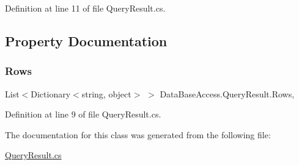 Definition at line 11 of file Query\+Result.\+cs.



\subsection{Property Documentation}
\mbox{\label{classDataBaseAccess_1_1QueryResult_ad6d699c5577f56da79740f1790433565}} 
\subsubsection{\texorpdfstring{Rows}{Rows}}
{\footnotesize\ttfamily List$<$Dictionary$<$string, object$>$ $>$ Data\+Base\+Access.\+Query\+Result.\+Rows\hspace{0.3cm}{\ttfamily [get]}, {}}



Definition at line 9 of file Query\+Result.\+cs.



The documentation for this class was generated from the following file\+:\begin{DoxyCompactItemize}
\item 
\mbox{\hyperlink{QueryResult_8cs}{Query\+Result.\+cs}}\end{DoxyCompactItemize}

